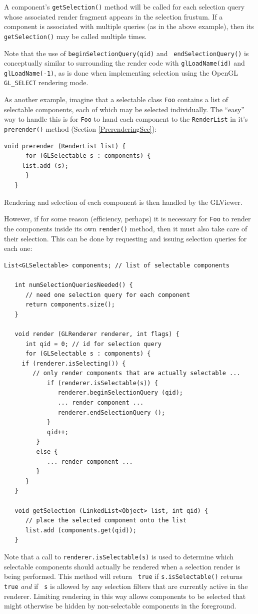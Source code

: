 \documentclass{article}
\begin{document}
\begin{sideblock}
A component's {\tt getSelection()} method will be called for each
selection query whose associated render fragment appears in the
selection frustum. If a component is associated with multiple queries
(as in the above example), then its {\tt getSelection()} may be called
multiple times.
\end{sideblock}

Note that the use of {\tt beginSelectionQuery(qid)} and {\tt
endSelectionQuery()} is conceptually similar to surrounding the render
code with {\tt glLoadName(id)} and {\tt glLoadName(-1)}, as is done
when implementing selection using the OpenGL {\tt GL\_SELECT}
rendering mode.

As another example, imagine that a selectable class {\tt Foo}
contains a list of selectable components, each of which may be
selected individually.  The ``easy'' way to handle this is for 
{\tt Foo} to hand each component to the {\tt RenderList} in
it's {\tt prerender()} method (Section \ref{PrerenderingSec}):
\begin{lstlisting}[]
   void prerender (RenderList list) {
      for (GLSelectable s : components) {
	 list.add (s);
      }
   }
\end{lstlisting}
Rendering and selection of each component is then handled by
the GLViewer.

However, if for some reason (efficiency, perhaps) it is necessary
for {\tt Foo} to render the components inside its own
{\tt render()} method, then it must also
take care of their selection. This can be done by requesting
and issuing selection queries for each one:
\begin{lstlisting}[]
   List<GLSelectable> components; // list of selectable components

   int numSelectionQueriesNeeded() {
      // need one selection query for each component
      return components.size();
   }

   void render (GLRenderer renderer, int flags) {
      int qid = 0; // id for selection query
      for (GLSelectable s : components) {
	 if (renderer.isSelecting()) {
	    // only render components that are actually selectable ...
            if (renderer.isSelectable(s)) {
               renderer.beginSelectionQuery (qid);
               ... render component ...
               renderer.endSelectionQuery ();
            }
            qid++;
         }
         else {
            ... render component ...
         }
      }
   }

   void getSelection (LinkedList<Object> list, int qid) {
      // place the selected component onto the list
      list.add (components.get(qid));
   }
\end{lstlisting}
Note that a call to {\tt renderer.isSelectable(s)} is used to
determine which selectable components should actually be rendered when
a selection render is being performed.  This method will return {\tt
true} if {\tt s.isSelectable()} returns {\tt true} {\it and} if {\tt
s} is allowed by any selection filters that are currently active in
the renderer. Limiting rendering in this way allows components to be
selected that might otherwise be hidden by non-selectable components
in the foreground.
\end{document}

